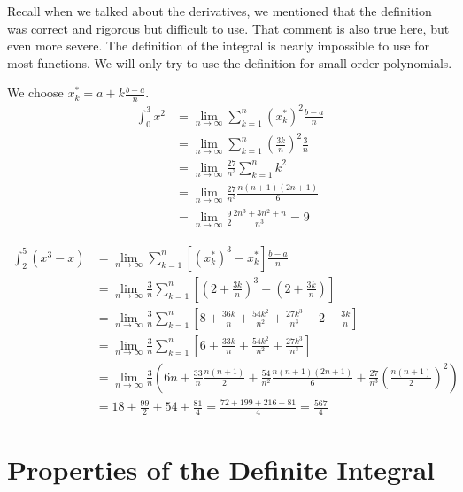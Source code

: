 \documentclass[fleqn]{report}
\begin{document}
Recall when we talked about the derivatives, we mentioned that
the definition was correct and rigorous but difficult to use.
That comment is also true here, but even more severe. The
definition of the integral is nearly impossible to use for
most functions. We will only try to use the definition for
small order polynomials.

\begin{example} 
We choose $x_k^* = a + k \frac{b-a}{n}$.
\begin{align*}
\int_0^3 x^2 
& = \lim_{n \rightarrow \infty} \sum_{k=1}^n (x^*_k)^2
\frac{b-a}{n} \\
& = \lim_{n \rightarrow \infty} \sum_{k=1}^n \left( \frac{3k}{n}
\right)^2 \frac{3}{n} \\
& = \lim_{n \rightarrow \infty} \frac{27}{n^3} \sum_{k=1}^n k^2 \\
& = \lim_{n \rightarrow \infty} \frac{27}{n^3} \frac{n(n+1)(2n+1)}{6} \\
& = \lim_{n \rightarrow \infty} \frac{9}{2}
\frac{2n^3+3n^2+n}{n^3} = 9
\end{align*}
\end{example}

\begin{example}
\begin{align*}
\int_2^5 (x^3-x) 
& = \lim_{n \rightarrow \infty} \sum_{k=1}^n \left[ (x^*_k)^3 -
x^*_k \right] \frac{b-a}{n} \\
& = \lim_{n \rightarrow \infty} \frac{3}{n} \sum_{k=1}^n \left[
\left(2 + \frac{3k}{n} \right)^3 - \left(2+ \frac{3k}{n}
\right) \right] \\
& = \lim_{n \rightarrow \infty} \frac{3}{n} \sum_{k=1}^n \left[
8 + \frac{36k}{n} + \frac{54k^2}{n^2} + \frac{27k^3}{n^3} - 2 -
\frac{3k}{n} \right] \\
& = \lim_{n \rightarrow \infty} \frac{3}{n} \sum_{k=1}^n \left[
6 + \frac{33k}{n} + \frac{54k^2}{n^2} + \frac{27k^3}{n^3} \right] \\
& = \lim_{n \rightarrow \infty} \frac{3}{n} \left( 6n +
\frac{33}{n} \frac{n(n+1)}{2} + \frac{54}{n^2}
\frac{n(n+1)(2n+1)}{6} + \frac{27}{n^3} \left( \frac{n(n+1)}{2}
\right)^2 \right) \\
& = 18 + \frac{99}{2} + 54 + \frac{81}{4} = \frac{72+ 199+ 216+
81}{4} = \frac{567}{4}
\end{align*}
\end{example}

\section*{Properties of the Definite Integral}
\end{document}
